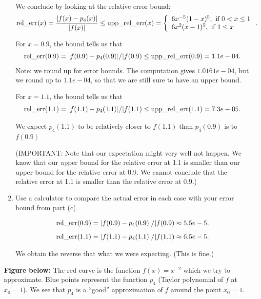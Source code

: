 \documentclass[pdftex,11pt]{article}
\begin{document}
\begin{enumerate}
We conclude by looking at the relative error bound:
$$  \textmd{rel\_err}(x) = \frac{| f(x) -  p_4(x) |}{|f(x)|} \leq  \textmd{upp\_rel\_err}(x) = \left\{ \begin{array}{l}  6 x^{-5}(1-x)^5, \textmd{ if }0<x\leq 1\\  6x^{2} (x-1)^5, \textmd{ if }1\leq x \end{array}\right..$$

For $x=0.9$, the bound tells us that
$$ \textmd{rel\_err}(0.9) = | f(0.9) -  p_4(0.9) |/|f(0.9)  \leq \textmd{upp\_rel\_err}(0.9) = 1.1e-04.$$
Note: we round up for error bounds. The computation gives $1.0161e-04$, but we round up to $1.1e-04$, so that we are still
sure to have an upper bound.

For $x=1.1$, the bound tells us that
$$ \textmd{rel\_err}(1.1) = | f(1.1) -  p_4(1.1) |/|f(1.1)  \leq \textmd{upp\_rel\_err}(1.1) =  7.3e-05.$$

We expect $p_4(1.1)$ to be relatively closer to $f(1.1)$ than $p_4(0.9)$ is to $f(0.9)$

(IMPORTANT: Note that our expectation might very well not happen. We know that
our upper bound for the relative error at 1.1 is smaller than our upper bound
for the relative error at 0.9. We cannot conclude that the relative error at
1.1 is smaller than the relative error at 0.9.)

\color{red}\item
Use a calculator to compare the actual error in each case with your error bound
from part (c).\\
\color{black}

$$ \textmd{rel\_err}(0.9) = | f(0.9) -  p_4(0.9) |/|f(0.9)  \approx 5.5e-5.$$
$$ \textmd{rel\_err}(1.1) = | f(1.1) -  p_4(1.1) |/|f(1.1)  \approx 6.5e-5.$$

We obtain the reverse that what we were expecting. (This is fine.)

\end{enumerate}

\textbf{Figure below:} The red curve is the function $f(x)=x^{-2}$ which we try to
approximate. Blue points represent the function $p_4$ (Taylor polynomial of $f$
at $x_0=1$).  We see that $p_4$ is a ``good'' approximation of $f$ around the
point $x_0=1$.
\end{document}
